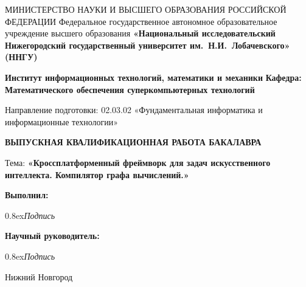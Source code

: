 {
\begin{titlepage}
  \begin{center}
    МИНИСТЕРСТВО НАУКИ И ВЫСШЕГО ОБРАЗОВАНИЯ РОССИЙСКОЙ ФЕДЕРАЦИИ\break
    Федеральное государственное автономное образовательное учреждение высшего образования\break
    \textbf{«Национальный исследовательский Нижегородский государственный университет им.~Н.И.~Лобачевского» (ННГУ)}
    \break

    \vspace*{1.25cm}

    \textbf{Институт информационных технологий, математики и механики}\break
    \textbf{Кафедра: Математического обеспечения суперкомпьютерных технологий}
    \vspace{0.5cm}

    Направление подготовки: 02.03.02 «Фундаментальная информатика и информационные технологии»\break

    \vspace{2.5cm}

    \large{\textbf{ВЫПУСКНАЯ КВАЛИФИКАЦИОННАЯ РАБОТА БАКАЛАВРА }}\break

    \vspace{0.25cm}

    Тема:\break
    \large{\textbf{«Кроссплатформенный фреймворк для задач искусственного интеллекта. Компилятор графа вычислений.»}}
  \end{center}

\vspace{2cm}

\hfill\textbf{Выполнил:} 

 \hfill \makebox[2cm]{\hrulefill} 

 \hfill  {\raise0.8ex\hbox{\footnotesize \textit{Подпись}}} \makebox[5.65cm]{\hfill}

 \hfill\textbf{Научный руководитель:} 

 \hfill \makebox[2cm]{\hrulefill} 

 \hfill  {\raise0.8ex\hbox{\footnotesize \textit{Подпись}}} \makebox[5.55cm]{\hfill}

\vfill
\begin{center}
  Нижний Новгород
\end{center}
\end{titlepage}
}
